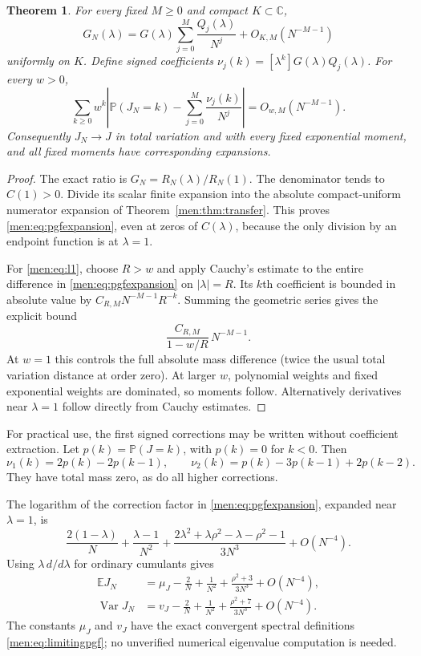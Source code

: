 \documentclass[11pt,letterpaper]{article}
\newtheorem{theorem}{Theorem}[section]
\theoremstyle{remark}\newtheorem{remark}[theorem]{Remark}
\newcommand{\E}{\mathbb E}\newcommand{\PP}{\mathbb P}
\newcommand{\Var}{\operatorname{Var}}\newcommand{\Tr}{\operatorname{Tr}}
\newcommand{\CC}{\mathbb C}\newcommand{\NN}{\mathbb N}
\begin{document}
\begin{theorem}\label{men:thm:weighted}
For every fixed $M\ge0$ and compact $K\subset\CC$,
\begin{equation}\label{men:eq:pgfexpansion}
 G_N(\lambda)=G(\lambda)\sum_{j=0}^M\frac{Q_j(\lambda)}{N^j}
                         +O_{K,M}(N^{-M-1})
\end{equation}
uniformly on $K$. Define signed coefficients
$\nu_j(k)=[\lambda^k]G(\lambda)Q_j(\lambda)$. For every $w>0$,
\begin{equation}\label{men:eq:l1}
 \sum_{k\ge0}w^k\left|\PP(J_N=k)-\sum_{j=0}^M\frac{\nu_j(k)}{N^j}\right|
                  =O_{w,M}(N^{-M-1}).
\end{equation}
Consequently $J_N\to J$ in total variation and with every fixed exponential moment, and all fixed moments have corresponding expansions.
\end{theorem}
\begin{proof}
The exact ratio is $G_N=R_N(\lambda)/R_N(1)$. The denominator tends to $C(1)>0$. Divide its scalar finite expansion into the absolute compact-uniform numerator expansion of Theorem~\ref{men:thm:transfer}. This proves \eqref{men:eq:pgfexpansion}, even at zeros of $C(\lambda)$, because the only division by an endpoint function is at $\lambda=1$.

For \eqref{men:eq:l1}, choose $R>w$ and apply Cauchy's estimate to the entire difference in \eqref{men:eq:pgfexpansion} on $|\lambda|=R$. Its $k$th coefficient is bounded in absolute value by $C_{R,M}N^{-M-1}R^{-k}$. Summing the geometric series gives the explicit bound
\[
 \frac{C_{R,M}}{1-w/R}\,N^{-M-1}.
\]
At $w=1$ this controls the full absolute mass difference (twice the usual total variation distance at order zero). At larger $w$, polynomial weights and fixed exponential weights are dominated, so moments follow. Alternatively derivatives near $\lambda=1$ follow directly from Cauchy estimates.
\end{proof}

For practical use, the first signed corrections may be written without coefficient extraction. Let $p(k)=\PP(J=k)$, with $p(k)=0$ for $k<0$. Then
\[
 \nu_1(k)=2p(k)-2p(k-1),\qquad
 \nu_2(k)=p(k)-3p(k-1)+2p(k-2).
\]
They have total mass zero, as do all higher corrections.

The logarithm of the correction factor in \eqref{men:eq:pgfexpansion}, expanded near $\lambda=1$, is
\begin{equation}\label{men:eq:logpgfcorrection}
 \frac{2(1-\lambda)}N+\frac{\lambda-1}{N^2}
 +\frac{2\lambda^2+\lambda\rho^2-\lambda-\rho^2-1}{3N^3}
 +O(N^{-4}).
\end{equation}
Using $\lambda\,d/d\lambda$ for ordinary cumulants gives
\begin{align}
 \E J_N&=\mu_J-\frac2N+\frac1{N^2}
               +\frac{\rho^2+3}{3N^3}+O(N^{-4}),\label{men:eq:mean}\\
 \Var J_N&=v_J-\frac2N+\frac1{N^2}
               +\frac{\rho^2+7}{3N^3}+O(N^{-4}).\label{men:eq:variance}
\end{align}
The constants $\mu_J$ and $v_J$ have the exact convergent spectral definitions \eqref{men:eq:limitingpgf}; no unverified numerical eigenvalue computation is needed.
\end{document}
